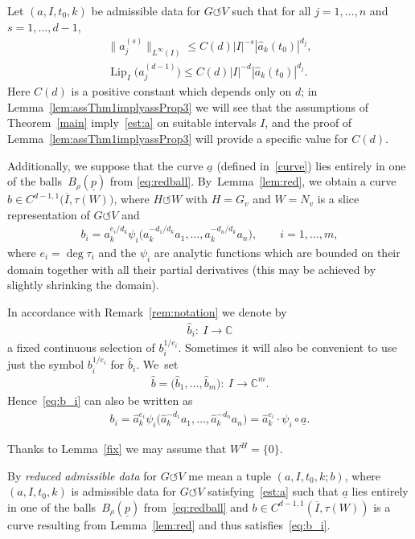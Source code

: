 \documentclass[pdftex]{sigma}
\numberwithin{equation}{section}
\def\rh{\rho}
\def\ta{\tau}
\def\ps{\psi}
\def\C{\mathbb{C}}
\def\ol{\overline}
\def\ul{\underline}
\def\Lip{\on{Lip}}
\def\we{\hat}
\renewcommand{\o}{\circ}
\def\acts{\circlearrowleft}
\let\on=\operatorname
\begin{document}
Let $(a, I, t_0, k)$ be admissible data for $G \acts V$ such that
for all
$j = 1,\dots,n$ and $ s = 1,\dots,d-1$,
 \begin{gather}%
 \big\|a_j^{(s)} \big\|_{L^\infty(I)} \le C(d) |I|^{-s} |\we a_k (t_0)|^{d_j},\nonumber
 \\
 \Lip_I \big(a_j^{(d-1)}\big) \le C(d) |I|^{-d} |\we a_k (t_0)|^{d_j}.
\label{est:a}
 \end{gather}
Here $C(d)$ is a positive constant which depends only on $d$; in
Lemma~\ref{lem:assThm1implyassProp3} we will see that the assumptions of Theorem~\ref{main}
imply~\eqref{est:a} on suitable intervals $I$, and the proof of Lemma~\ref{lem:assThm1implyassProp3}
will provide a specific value for $C(d)$.

Additionally,
we suppose that the curve $\underline a$ (defined in~\eqref{curve}) lies entirely in one of the balls~$B_\rh(\underline p)$ from
\eqref{eq:redball}. By~Lemma~\ref{lem:red}, we obtain a curve $b \in C^{d-1,1}\big(\ol I,\ta(W)\big)$, where $H \acts W$ with $H=G_v$ and $W=N_v$ is a
slice representation of $G \acts V$ and
\begin{gather} \label{eq:b_i}
 b_i = a_k^{e_i/d_k} \ps_i \big(a_k^{-d_1/d_k} a_1, \dots, a_k^{-d_n/d_k} a_n\big), \qquad i = 1,\dots,m,
\end{gather}
 where $e_i = \deg \ta_i$ and the $\ps_i$ are analytic functions which are bounded on their domain together with all
 their partial derivatives (this may be achieved by slightly shrinking the domain).

In accordance with Remark~\ref{rem:notation} we denote by
\begin{gather*}
 \we b_i \colon\ I \to \C
\end{gather*}
a fixed continuous selection of $b_i^{1/e_i}$. Sometimes it will also be convenient to use just the
symbol $b_i^{1/e_i}$ for $\we b_i$. We~set
\begin{gather*}
 \we b = \big(\we b_1,\dots,\we b_m\big) \colon\ I \to \C^m.
\end{gather*}
Hence~\eqref{eq:b_i} can also be written as
\begin{gather*}
 b_i = \we a_k^{e_i} \ps_i \big(\we a_k^{-d_1} a_1, \dots, \we a_k^{-d_n} a_n\big) = \we a_k^{e_i}\cdot \ps_i \o \ul a.
\end{gather*}

Thanks to Lemma~\ref{fix} we may assume that $W^H = \{0\}$.


\begin{Definition}
 By \emph{reduced admissible data} for $G \acts V$ me mean a tuple $(a, I, t_0, k; b)$, where
 $(a, I, t_0, k)$ is admissible data for $G \acts V$
 satisfying~\eqref{est:a}
 such that $\ul a$
 lies entirely in one of the balls~$B_\rh(\underline p)$ from~\eqref{eq:redball}
 and $b \in C^{d-1,1}(\ol I,\ta(W))$ is a curve resulting from Lemma~\ref{lem:red}
 and thus satisfies~\eqref{eq:b_i}.
\end{Definition}
\end{document}
